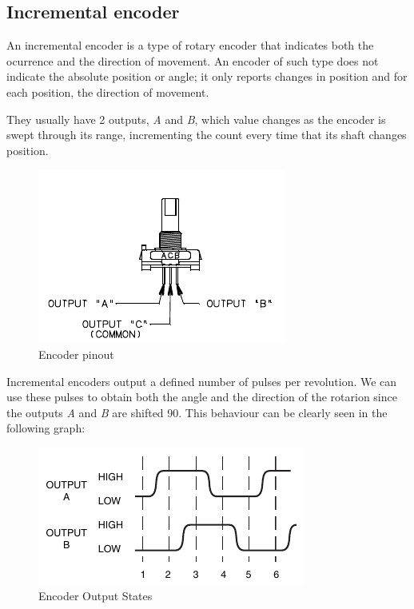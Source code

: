 \clearpage

\subsection{Incremental encoder}

An incremental encoder is a type of rotary encoder that indicates both the ocurrence and the direction of movement. An encoder of such type does not indicate the absolute position or angle; it only reports changes in position and for each position, the direction of movement. \medskip

They usually have 2 outputs, \textit{A} and \textit{B}, which value changes as the encoder is swept through its range, incrementing the count every time that its shaft changes position.\medskip

\vspace{-0.5cm}

\begin{figure}[H]
    \centering
    \includegraphics[scale = 1.3]{Graphics/Practice 4/ENCODER_DRAWING.pdf}
    \caption{Encoder pinout ~\autocite{ENCODER}}
    \label{fig:ENCODER_PINOUT}
\end{figure}

Incremental encoders output a defined number of pulses per revolution. We can use these pulses to obtain both the angle and the direction of the rotarion since the outputs \textit{A} and \textit{B} are shifted 90\textdegree. This behaviour can be clearly seen in the following graph:\medskip

\begin{figure}[H]
    \centering
    \includegraphics[scale = 1.5]{Graphics/Practice 4/ENCODER_POSITION.pdf}
    \caption{Encoder Output States ~\autocite{ENCODER}}
    \label{fig:ENCODER_STATES}
\end{figure}

